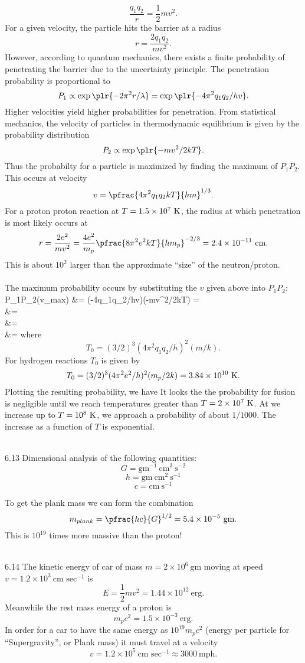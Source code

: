 \documentclass[10pt,letterpaper]{article}
\begin{document}
\[
	\frac{q_1q_2}{r} = \frac12 mv^2.
\]
For a given velocity, the particle hits the barrier at a radius
\[
	r = \frac{2q_1q_2}{mv^2}.
\]
However, according to quantum mechanics, there exists a finite probability of penetrating the barrier due to the uncertainty principle. The penetration probability is proportional to
\[
	P_1 \propto \exp\plr{ -2\pi^2r/\lambda} = \exp\plr{ -4\pi^2q_1q_2/hv}.
\]
Higher velocities yield higher probabilities for penetration. From statistical mechanics, the velocity of particles in thermodynamic equilibrium is given by the probability distribution
\[
	P_2 \propto \exp\plr{ -mv^2/2kT}.
\]
Thus the probabilty for a particle is maximized by finding the maximum of $P_1P_2$. This occurs at velocity
\[
	v = \pfrac{4\pi^2q_1q_2kT}{hm}^{1/3}.
\]
For a proton proton reaction at $T=1.5\times 10^7\ \text K$, the radius at which penetration is most likely occurs at
\[
	r = \frac{2e^2}{mv^2} = \frac{4e^2}{m_p}\pfrac{8\pi^2e^2kT}{hm_p}^{-2/3} = 2.4\times 10^{-11}\ \text{cm}.
\]
This is about $10^2$ larger than the approximate ``size'' of the neutron/proton. 
\\ \\
The maximum probability occurs by substituting the $v$ given above into $P_1P_2$:
\ba
	P_1P_2(v_{max}) &= \exp(-4\pi q_1q_2/hv)\exp(-mv^2/2kT) = \exp {} \\
	&=\exp{}\\
	&= \exp{}\\
	&= \exp{}
\ea
where 
\[
	T_0 = (3/2)^3(4\pi^2 q_1q_2/h)^2(m/k).
\]
For hydrogen reactions $T_0$ is given by
\[
	T_0 = (3/2)^3(4\pi^2e^2/h)^2(m_p/2k) = 3.84\times 10^{10}\ \text K.
\]
Plotting the resulting probability, we have
It looks the the probability for fusion is negligible until we reach temperatures greater than $T= 2\times10^7\ \text K$. At we increase up to $T=10^8\ \text K$, we approach a probability of about $1/1000$. The increase as a function of $T$ is exponential. 
\\ \\
\item[6.13]
Dimensional analysis of the following quantities:
\[
	G = \text{gm}^{-1}\ \text{cm}^3\ \text{s}^{-2}
\]
\[
	h = \text{gm}\ \text{cm}^2\ \text{s}^{-1}
\]
\[
	c = \text{cm}\ \text{s}^{-1}
\]

To get the plank mass we can form the combination
\[
	m_{plank} =\pfrac{hc}{G}^{1/2} = 5.4\times 10^{-5}\ \text{gm}.
\]
This is $10^{19}$ times more massive than the proton!
\\ \\
\item[6.14]
The kinetic energy of car of mass $m=2\times 10^6\ \text{gm}$ moving at speed $v = 1.2\times 10^3\ \text{cm sec}^{-1}$ is 
\[
	E = \frac12 mv^2 = 1.44\times 10^{12}\ \text{erg}.
\]
Meanwhile the rest mass energy of a proton is 
\[
	m_pc^2 = 1.5\times 10^{-3}\ \text{erg}.
\]
In order for a car to have the same energy as $10^19 m_p c^2$ (energy per particle for ``Supergravity'', or Plank mass) it must travel at a velocity
\[
	v = 1.2\times 10^5\ \text{cm sec}^{-1} \approx 3000\ \text{mph}.
\]

\eenum
\end{document}
